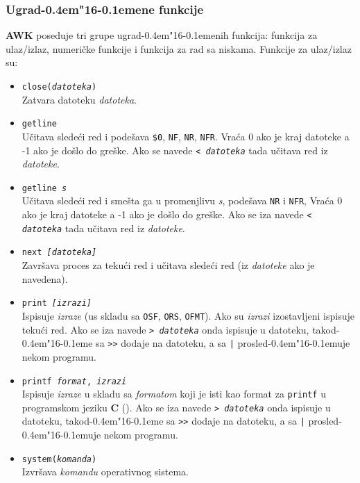 \documentclass[12pt,a4paper]{article}
\def\d{d\kern-0.4em\char"16\kern-0.1em}
\begin{document}
      \subsubsection{Ugra\d ene funkcije}
        \label{sub:awkfunkcije}
        {\bf AWK} poseduje tri grupe ugra\d enih funkcija: funkcija za
        ulaz/izlaz, numeri\v cke funkcije i funkcija za rad sa niskama.
        Funkcije za ulaz/izlaz su:
        \begin{itemize}
        \item
          {\tt close({\it datoteka})}\\
          Zatvara datoteku {\it datoteka}.
        \item
          {\tt getline}\\
          U\v citava slede\'ci red i pode\v sava {\tt\$0}, {\tt NF}, {\tt NR},
          {\tt NFR}.
          Vra\'ca 0 ako je kraj datoteke a -1 ako je do\v slo do gre\v ske.
          Ako se navede {\tt< {\it datoteka}} tada u\v citava red iz
          {\it datoteke}.
        \item
          {\tt getline {\it s}}\\
          U\v citava slede\'ci red i sme\v sta ga u promenjlivu {\it s},
          pode\v sava {\tt NR} i {\tt NFR},
          Vra\'ca 0 ako je kraj datoteke a -1 ako je do\v slo do gre\v ske.
          Ako se iza navede {\tt< {\it datoteka}} tada u\v citava red iz
          {\it datoteke}.
        \item
          {\tt next {\it [datoteka]}}\\
          Zavr\v sava proces za teku\'ci red i u\v citava slede\'ci red (iz
          {\it datoteke} ako je navedena).
        \item
          {\tt print {\it [izrazi]}}\\
          Ispisuje {\it izraze} (us skladu sa {\tt OSF}, {\tt ORS},
          {\tt OFMT}).
          Ako su {\it izrazi} izostavljeni ispisuje teku\'ci red.
          Ako se iza navede {\tt> {\it datoteka}} onda ispisuje u datoteku,
          tako\d e sa {\tt>>} dodaje na datoteku, a sa {\tt|} prosle\d uje
          nekom programu.
        \item
          {\tt printf {\it format}, {\it izrazi}}\\
          Ispisuje {\it izraze} u skladu sa {\it formatom} koji je isti kao
          format za {\tt printf} u programskom jeziku {\bf C} (\cite{KR,AWK}).
          Ako se iza navede {\tt> {\it datoteka}} onda ispisuje u datoteku,
          tako\d e sa {\tt>>} dodaje na datoteku, a sa {\tt|} prosle\d uje
          nekom programu.
        \item
          {\tt system({\it komanda})}\\
          Izvr\v sava {\it komandu} operativnog sistema.
        \end{itemize}
\end{document}
